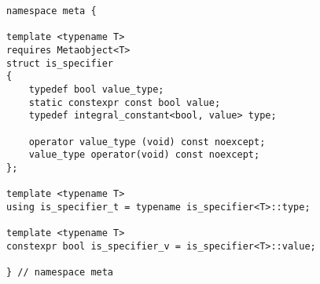 
\begin{verbatim}
namespace meta {

template <typename T>
requires Metaobject<T>
struct is_specifier
{
	typedef bool value_type;
	static constexpr const bool value;
	typedef integral_constant<bool, value> type;

	operator value_type (void) const noexcept;
	value_type operator(void) const noexcept;
};

template <typename T>
using is_specifier_t = typename is_specifier<T>::type;

template <typename T>
constexpr bool is_specifier_v = is_specifier<T>::value;

} // namespace meta
\end{verbatim}
